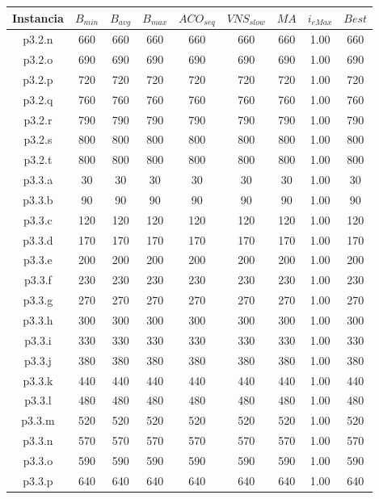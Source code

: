 \begin{table}
\begin{center}
\begin{tabular}{ |c|c|c|c|c|c|c|c|c| } 
\hline
Instancia & $B_{min}$ & $B_{avg}$ & $B_{max}$ & $ACO_{seq}$ & $VNS_{slow}$ & $MA$ & $i_{eMax}$ & $Best$ \\
\hline
p3.2.n & 660 & 660 & 660 & 660 & 660 & 660 & 1.00 & 660 \\
p3.2.o & 690 & 690 & 690 & 690 & 690 & 690 & 1.00 & 690 \\
p3.2.p & 720 & 720 & 720 & 720 & 720 & 720 & 1.00 & 720 \\
p3.2.q & 760 & 760 & 760 & 760 & 760 & 760 & 1.00 & 760 \\
p3.2.r & 790 & 790 & 790 & 790 & 790 & 790 & 1.00 & 790 \\
p3.2.s & 800 & 800 & 800 & 800 & 800 & 800 & 1.00 & 800 \\
p3.2.t & 800 & 800 & 800 & 800 & 800 & 800 & 1.00 & 800 \\
p3.3.a & 30 & 30 & 30 & 30 & 30 & 30 & 1.00 & 30 \\
p3.3.b & 90 & 90 & 90 & 90 & 90 & 90 & 1.00 & 90 \\
p3.3.c & 120 & 120 & 120 & 120 & 120 & 120 & 1.00 & 120 \\
p3.3.d & 170 & 170 & 170 & 170 & 170 & 170 & 1.00 & 170 \\
p3.3.e & 200 & 200 & 200 & 200 & 200 & 200 & 1.00 & 200 \\
p3.3.f & 230 & 230 & 230 & 230 & 230 & 230 & 1.00 & 230 \\
p3.3.g & 270 & 270 & 270 & 270 & 270 & 270 & 1.00 & 270 \\
p3.3.h & 300 & 300 & 300 & 300 & 300 & 300 & 1.00 & 300 \\
p3.3.i & 330 & 330 & 330 & 330 & 330 & 330 & 1.00 & 330 \\
p3.3.j & 380 & 380 & 380 & 380 & 380 & 380 & 1.00 & 380 \\
p3.3.k & 440 & 440 & 440 & 440 & 440 & 440 & 1.00 & 440 \\
p3.3.l & 480 & 480 & 480 & 480 & 480 & 480 & 1.00 & 480 \\
p3.3.m & 520 & 520 & 520 & 520 & 520 & 520 & 1.00 & 520 \\
p3.3.n & 570 & 570 & 570 & 570 & 570 & 570 & 1.00 & 570 \\
p3.3.o & 590 & 590 & 590 & 590 & 590 & 590 & 1.00 & 590 \\
p3.3.p & 640 & 640 & 640 & 640 & 640 & 640 & 1.00 & 640 \\

\end{tabular}
\end{center}
\end{table}
